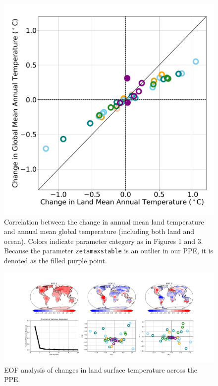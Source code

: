 \documentclass[draft, grl]{agujournal2019}
\begin{document}
\begin{figure}[htb!]
\noindent\includegraphics[width=\textwidth]{writing/figs/Figure_S3.pdf}
\caption{Correlation between the change in annual mean land temperature and annual mean global temperature (including both land and ocean). Colors indicate parameter category as in Figures 1 and 3. Because the parameter \texttt{zetamaxstable} is an outlier in our PPE, it is denoted as the filled purple point.}
\label{fig:supp_coupled_Ts_land_vs_ocean_maps}
\end{figure}

\begin{figure}[htb!]
\noindent\includegraphics[width=\textwidth]{writing/figs/Figure_S_TSKIN_EOF_summary.pdf}
\caption{EOF analysis of changes in land surface temperature across the PPE. }
\label{fig:supp_EOF_analysis_Temp}
\end{figure}
\end{document}
